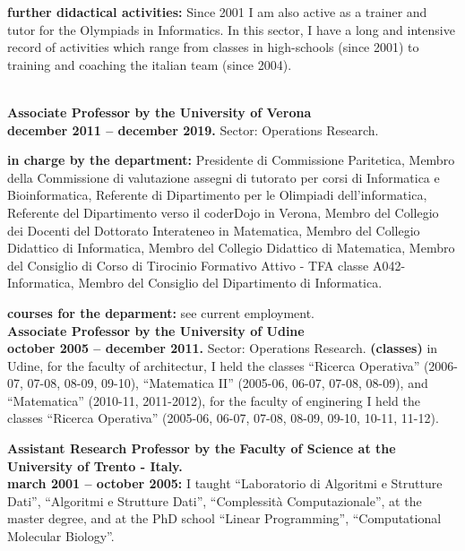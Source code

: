 \documentclass[10pt]{article}
\newcommand{\voice}[1] { \bigskip \medskip \noindent {\Large \bf #1} \medskip\\ }
\newcommand{\subvoice}[1] { {\large \bf #1} \smallskip\\ }
\begin{document}
{\bf further didactical activities:}
Since 2001 I am also active as a trainer and tutor for the Olympiads in Informatics.
In this sector, I have a long and intensive record of activities
which range from classes in high-schools (since 2001) to training and coaching
the italian team (since 2004).\\

\vspace{1.8mm}

\voice{{\LARGE Work Experience}}

\subvoice{Associate Professor by the University of Verona}
{\bf december 2011 -- december 2019.}
Sector: Operations Research.

{\bf in charge by the department:} Presidente di Commissione Paritetica, Membro della Commissione di valutazione assegni di tutorato per corsi di Informatica e Bioinformatica, Referente di Dipartimento per le Olimpiadi dell'informatica, Referente del Dipartimento verso il coderDojo in Verona, Membro del Collegio dei Docenti del Dottorato Interateneo in Matematica, Membro del Collegio Didattico di Informatica, Membro del Collegio Didattico di Matematica, Membro del Consiglio di Corso di Tirocinio Formativo Attivo - TFA classe A042- Informatica, Membro del Consiglio del Dipartimento di Informatica.

{\bf courses for the deparment:} see current employment.\\

\subvoice{Associate Professor by the University of Udine}
{\bf october 2005 -- december 2011.}
Sector: Operations Research.
{\bf (classes)} in Udine,
for the faculty of architectur,
I held the classes ``Ricerca Operativa'' (2006-07, 07-08, 08-09, 09-10), ``Matematica II'' (2005-06, 06-07, 07-08, 08-09),
and ``Matematica'' (2010-11, 2011-2012), for the faculty of enginering I held the classes ``Ricerca Operativa'' (2005-06, 06-07, 07-08, 08-09, 09-10, 10-11, 11-12).


\subvoice{Assistant Research Professor
          by the Faculty of Science
          at the University of Trento - Italy.}
{\bf march 2001 -- october 2005:}
I taught ``Laboratorio di Algoritmi e Strutture Dati'', ``Algoritmi e Strutture Dati'', ``Complessit\`a Computazionale'', at the master degree, and at the PhD school ``Linear Programming'', ``Computational Molecular Biology''.\\
\end{document}
